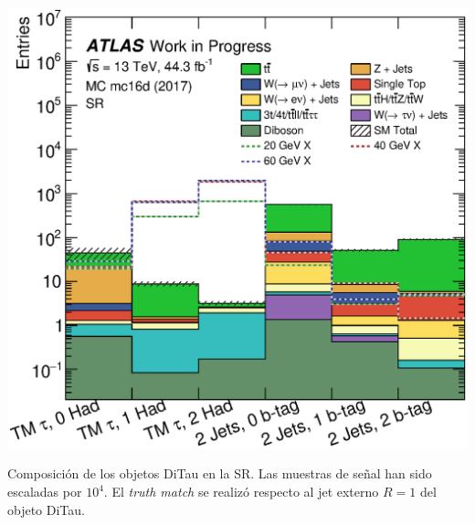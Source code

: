 \begin{marginfigure}[8em]
    \includegraphics[width=0.99\linewidth]{Assets/Plots/SR/h_stack_mc16d_ditau_composition.eps}
    \caption{Composición de los objetos DiTau en la SR. Las muestras de señal han sido escaladas por $10^4$. El \textit{truth match} se realizó respecto al jet externo $R = 1$ del objeto DiTau.}
    \label{fig:ch4:SR:ditau_composition}
\end{marginfigure}

